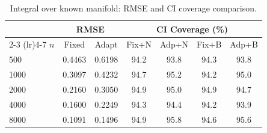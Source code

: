 \begin{table}[!h]
\centering
\small
\caption{Integral over known manifold: RMSE and CI coverage comparison.}
\label{tab:Sim1_Circle_Comp}
\begin{tabular}{lcccccc}
\hline\hline
 & \multicolumn{2}{c}{RMSE} & \multicolumn{4}{c}{CI Coverage (\%)} \\
\cmidrule(lr){2-3} \cmidrule(lr){4-7}
$n$ & Fixed & Adapt & Fix+N & Adp+N & Fix+B & Adp+B \\
\hline
500 & 0.4463 & 0.6198 & 94.2 & 93.8 & 94.3 & 93.8\\
1000 & 0.3097 & 0.4232 & 94.7 & 95.2 & 94.2 & 95.0\\
2000 & 0.2160 & 0.3050 & 94.9 & 95.0 & 94.9 & 94.7\\
4000 & 0.1600 & 0.2249 & 94.3 & 94.4 & 94.2 & 93.9\\
8000 & 0.1091 & 0.1496 & 94.9 & 95.8 & 94.6 & 95.6\\
\hline\hline
\end{tabular}
\end{table}

